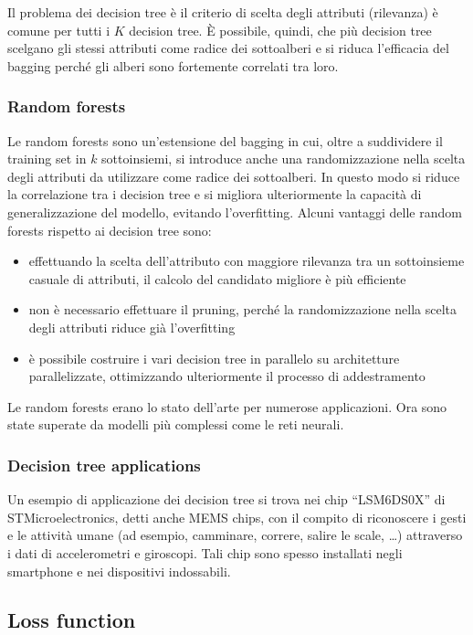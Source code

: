 Il problema dei decision tree è il criterio di scelta degli attributi (rilevanza) è comune per tutti i \(K\) decision tree.
È possibile, quindi, che più decision tree scelgano gli stessi attributi come radice dei sottoalberi e si riduca l'efficacia
del bagging perché gli alberi sono fortemente correlati tra loro.

\subsubsection*{Random forests}
Le random forests sono un'estensione del bagging in cui, oltre a suddividere il training set in \(k\) sottoinsiemi, si introduce
anche una randomizzazione nella scelta degli attributi da utilizzare come radice dei sottoalberi. In questo modo si riduce
la correlazione tra i decision tree e si migliora ulteriormente la capacità di generalizzazione del modello, evitando l'overfitting.
Alcuni vantaggi delle random forests rispetto ai decision tree sono:
\begin{itemize}
	\item effettuando la scelta dell'attributo con maggiore rilevanza tra un sottoinsieme casuale di attributi, il calcolo
	del candidato migliore è più efficiente
	\item non è necessario effettuare il pruning, perché la randomizzazione nella scelta degli attributi riduce già l'overfitting
	\item è possibile costruire i vari decision tree in parallelo su architetture parallelizzate, ottimizzando ulteriormente
	il processo di addestramento
\end{itemize}
Le random forests erano lo stato dell'arte per numerose applicazioni. Ora sono state superate da modelli più complessi come
le reti neurali.

\subsubsection*{Decision tree applications}
Un esempio di applicazione dei decision tree si trova nei chip ``LSM6DS0X'' di STMicroelectronics, detti anche MEMS chips, con
il compito di riconoscere i gesti e le attività umane (ad esempio, camminare, correre, salire le scale, \dots) attraverso i dati
di accelerometri e giroscopi. Tali chip sono spesso installati negli smartphone e nei dispositivi indossabili.


\subsection{Loss function}
